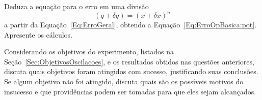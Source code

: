 \begin{question}[type={exam}]{1}
Deduza a equação para o erro em uma divisão
\begin{equation}
    (q \pm \delta q) = (x \pm \delta x)^n
\end{equation}
%
a partir da Equação~\eqref{Eq:ErroGeral}, obtendo a Equação~\eqref{Eq:ErroOpBasica:pot}. Apresente os cálculos.
\end{question}

\begin{question}[type={exam}]{2}
Considerando os objetivos do experimento, listados na Seção~\ref{Sec:ObjetivosOscilacoes}, e os resultados obtidos nas questões anteriores, discuta quais objetivos foram atingidos com sucesso, justificando suas conclusões. Se algum objetivo não foi atingido, discuta quais são os possíveis motivos do insucesso e que providências podem ser tomadas para que eles sejam alcançados.
\end{question}

\vfill
\pagebreak
